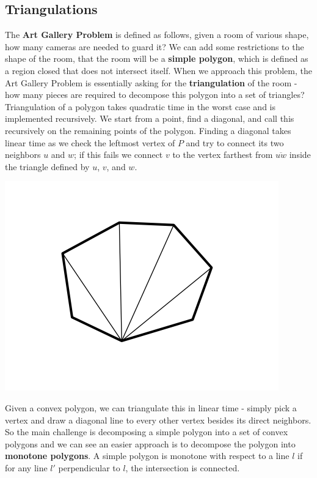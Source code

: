\documentclass[10pt]{article}
\begin{document}
\begin{multicols}{2}
\subsection{Triangulations}
\indent The \textbf{Art Gallery Problem} is defined as follows, given a room of various shape, how many cameras are needed to guard it? We can add some restrictions to the shape of the room, that the room will be a \textbf{simple polygon}, which is defined as a region closed that does not intersect itself. When we approach this problem, the Art Gallery Problem is essentially asking for the \textbf{triangulation} of the room - how many pieces are required to decompose this polygon into a set of triangles? \newline \\
\indent Triangulation of a polygon takes quadratic time in the worst case and is implemented recursively. We start from a point, find a diagonal, and call this recursively on the remaining points of the polygon. Finding a diagonal takes linear time as we check the leftmost vertex of $P$ and try to connect its two neighbors $u$ and $w$; if this fails we connect $v$ to the vertex farthest from $\overline{uw}$ inside the triangle defined by $u$, $v$, and $w$. \newline \\
\centerline{\includegraphics[scale=0.4]{convex_triangulation.png}}
\indent Given a convex polygon, we can triangulate this in linear time - simply pick a vertex and draw a diagonal line to every other vertex besides its direct neighbors. So the main challenge is decomposing a simple polygon into a set of convex polygons and we can see an easier approach is to decompose the polygon into \textbf{monotone polygons}. A simple polygon is monotone with respect to a line $l$ if for any line $l'$ perpendicular to $l$, the intersection is connected.

\end{multicols}
\end{document}
